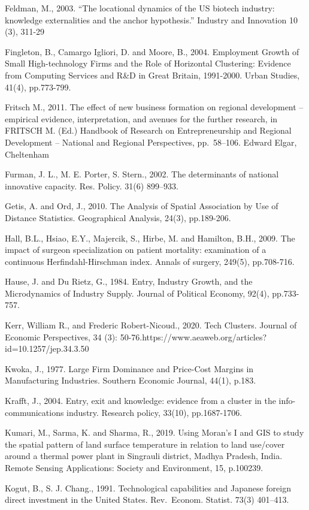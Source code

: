 \documentclass[
  12pt,
  oneside]{book}
\begin{document}
Feldman, M., 2003. ``The locational dynamics of the US biotech industry: knowledge externalities
and the anchor hypothesis.'' Industry and Innovation 10 (3), 311-29

Fingleton, B., Camargo Igliori, D. and Moore, B., 2004. Employment Growth of Small High-technology Firms and the Role of Horizontal Clustering: Evidence from Computing Services and R\&D in Great Britain, 1991-2000. Urban Studies, 41(4), pp.773-799.

Fritsch M., 2011. The effect of new business formation on regional development -- empirical evidence, interpretation, and avenues for the further research, in FRITSCH M. (Ed.) Handbook of Research on Entrepreneurship and Regional Development -- National and Regional Perspectives, pp.~58--106. Edward Elgar, Cheltenham

Furman, J. L., M. E. Porter, S. Stern., 2002. The determinants of national innovative capacity. Res. Policy. 31(6) 899--933.

Getis, A. and Ord, J., 2010. The Analysis of Spatial Association by Use of Distance Statistics. Geographical Analysis, 24(3), pp.189-206.

Hall, B.L., Hsiao, E.Y., Majercik, S., Hirbe, M. and Hamilton, B.H., 2009. The impact of surgeon specialization on patient mortality: examination of a continuous Herfindahl-Hirschman index. Annals of surgery, 249(5), pp.708-716.

Hause, J. and Du Rietz, G., 1984. Entry, Industry Growth, and the Microdynamics of Industry Supply. Journal of Political Economy, 92(4), pp.733-757.

Kerr, William R., and Frederic Robert-Nicoud., 2020. Tech Clusters. Journal of Economic Perspectives, 34 (3): 50-76.https://www.aeaweb.org/articles?id=10.1257/jep.34.3.50

Kwoka, J., 1977. Large Firm Dominance and Price-Cost Margins in Manufacturing Industries. Southern Economic Journal, 44(1), p.183.

Krafft, J., 2004. Entry, exit and knowledge: evidence from a cluster in the info-communications industry. Research policy, 33(10), pp.1687-1706.

Kumari, M., Sarma, K. and Sharma, R., 2019. Using Moran's I and GIS to study the spatial pattern of land surface temperature in relation to land use/cover around a thermal power plant in Singrauli district, Madhya Pradesh, India. Remote Sensing Applications: Society and Environment, 15, p.100239.

Kogut, B., S. J. Chang., 1991. Technological capabilities and Japanese foreign direct investment in the United States. Rev.~Econom. Statist. 73(3) 401--413.
\end{document}
